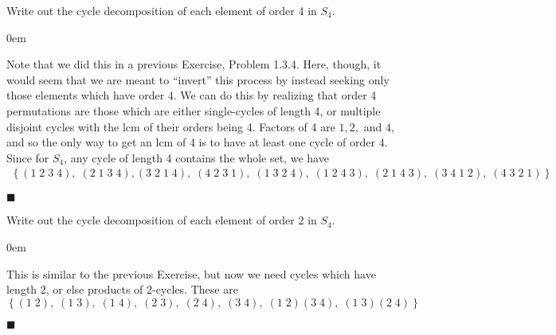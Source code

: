 \documentclass[12pt]{article}
\renewcommand{\qed}{\hfill$\blacksquare$}
\renewenvironment{proof}{\begin{addmargin}[1em]{0em}\begin{newproof}}{\end{newproof}\end{addmargin}\qed}
\newenvironment{problem}[2][Exercise]{\begin{trivlist}
\item[\hskip \labelsep {\bfseries #1}\hskip \labelsep {\bfseries #2.}]}{\end{trivlist}}
\begin{document}
\begin{problem}{1.3.6} Write out the cycle decomposition of each element of order 4 in $S_4$.
\end{problem}
\begin{proof}
Note that we did this in a previous Exercise, Problem 1.3.4. Here, though, it would seem that we are meant to ``invert'' this process by instead seeking only those elements which have order $4$. We can do this by realizing that order 4 permutations are those which are either single-cycles of length 4, or multiple disjoint cycles with the lcm of their orders being 4. Factors of 4 are $1,2,$ and $4$, and so the only way to get an lcm of $4$ is to have at least one cycle of order $4$. Since for $S_4$, any cycle of length 4 contains the whole set, we have 
\begin{equation*}\begin{split}
   \left\{ \left(1\;2\;3\;4\right), \; \left(2\;1\;3\;4\right),  \left(3\;2\;1\;4\right),\; \left(4\;2\;3\;1\right), \; \left(1\;3\;2\;4\right),\; \left(1\;2\;4\;3\right), \; \left(2\;1\;4\;3\right), \; \left(3\;4\;1\;2\right), \; \left(4\;3\;2\;1\right) \right\}
\end{split}\end{equation*}
\end{proof}


\begin{problem}{1.3.7} Write out the cycle decomposition of each element of order 2 in $S_4$.
\end{problem}
\begin{proof}
This is similar to the previous Exercise, but now we need cycles which have length 2, or else products of 2-cycles. These are
\begin{equation*}
    \left\{ \left(1\;2\right), \; \left(1\;3\right), \; \left(1\;4\right), \; \left(2 \; 3\right), \; \left(2\;4\right), \; \left(3\;4\right), \; \left(1\;2\right)\left(3\;4\right), \; \left(1\;3\right)\left(2\;4\right)  \right\}
\end{equation*}
\end{proof}
\end{document}
